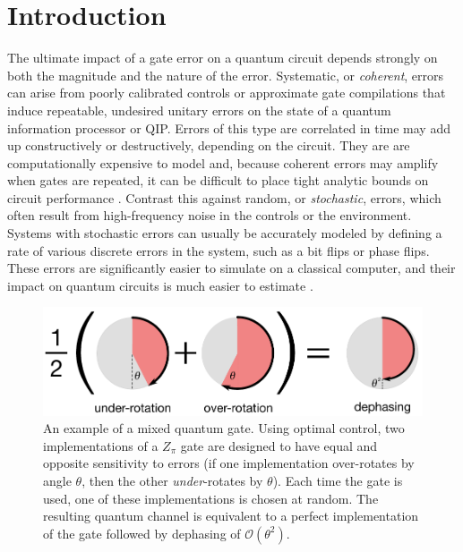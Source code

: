\documentclass[aps,nofootinbib,pra,notitlepage,twocolumn]{revtex4-1}
\newcommand{\order}[1]{\mathcal{O}\left( #1 \right)}
\begin{document}
\section{Introduction}
\label{sec:introduction}
\noindent The ultimate impact of a gate error on a quantum circuit depends strongly on both the magnitude and the nature of the error. Systematic, or \emph{coherent}, errors can arise from poorly calibrated controls or approximate gate compilations that induce repeatable, undesired unitary errors on the state of a quantum information processor or QIP. Errors of this type are correlated in time may add up constructively or destructively, depending on the circuit. They are are  computationally expensive to model and, because coherent errors may amplify when gates are repeated, it can be difficult to place tight analytic bounds on circuit performance \cite{Beale2018}. Contrast this against random, or \emph{stochastic}, errors, which often result from high-frequency noise in the controls or the environment. Systems with stochastic errors can usually be accurately modeled by defining a rate of various discrete errors in the system, such as a bit flips or phase flips. These errors are significantly easier to simulate on a classical computer, and their impact on quantum circuits is much easier to estimate \cite{Beale2018}.

\begin{figure}[t]
  \centering
  \includegraphics[width=\columnwidth]{simple_example.pdf}
  \caption{An example of a mixed quantum gate. Using optimal control, two implementations of a $Z_\pi$ gate are designed to have equal and opposite sensitivity to errors (if one implementation over-rotates by angle $\theta$, then the other \emph{under}-rotates by $\theta$). Each time the gate is used, one of these implementations is chosen at random. The resulting quantum channel is equivalent to a perfect implementation of the gate followed by dephasing of $\order{\theta^2}$.}
  \label{fig:simple_example}
\end{figure}
\end{document}
